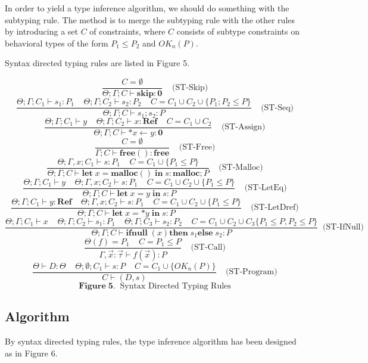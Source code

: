 \documentclass[english]{jssst_ppl} %
\newcommand\LET{\mathbf{let}\;}
\newcommand\IN{\mathbf{in}\;}
\newcommand\SKIP{\mathbf{skip}}
\newcommand\Rtab{\; \; \; \;}
\newcommand\IFNULL{\mathbf{ifnull}\;}
\newcommand\THEN{\mathbf{then}\;}
\newcommand\ELSE{\mathbf{else}\;}
\newcommand\Malloc{\mathbf{malloc}}
\newcommand\Free{\mathbf{free}}
\newcommand\Cirx{(x)}
\theoremstyle{definition}
\begin{document}
In order to yield a type inference algorithm, we should do something with the subtyping rule. The method is to merge the subtyping rule with the other rules by introducing a set $C$ of constraints, where $C$ consists of subtype constraints on behavioral types of the form $P_{1}\le P_{2}$ and $OK_{n}(P)$.

Syntax directed typing rules are listed in Figure 5.

$$
     \frac{ C = \emptyset}
           {\Theta; \Gamma; C \vdash \SKIP : \mathbf{0}}
      \Rtab \mbox{(ST-Skip)}
$$
$$
      \frac{\Theta;\Gamma ; C_{1} \vdash s_{1} : P_{1} \Rtab \Theta; \Gamma ; C_{2} \vdash s_{2} : P_{2} \Rtab C = C_{1}\cup C_{2} \cup \{ P_{1};P_{2} \le P\}}
      {\Theta;\Gamma; C \vdash s_{1};s_{2} : P}
      \Rtab \mbox{(ST-Seq)}
$$
$$
      \frac{\Theta;\Gamma;C_{1} \vdash y \Rtab \Theta;\Gamma; C_{2} \vdash x : \mathbf{Ref} \Rtab C = C_{1}\cup C_{2}}
      {\Theta;\Gamma; C \vdash *x \leftarrow y : \mathbf{0}}
      \Rtab \mbox{(ST-Assign)}
$$
$$
      \frac{C = \emptyset}
      {\Gamma ; C \vdash \Free() : \Free}
     \Rtab \mbox{(ST-Free)}
$$
$$
     \frac{\Theta;\Gamma, x ; C_{1} \vdash s : P_{1} \Rtab C = C_{1} \cup\{P_{1}\le P\}}
     {\Theta;\Gamma; C \vdash \LET x = \Malloc() \; \IN s : \Malloc ; P}
     \Rtab \mbox{(ST-Malloc)}
$$
$$
     \frac{\Theta;\Gamma; C_{1} \vdash y \Rtab \Theta;\Gamma, x ; C_{2} \vdash s : P_{1} \Rtab C = C_{1}\cup C_{2} \cup \{P_{1} \le P \}}
     {\Theta;\Gamma ; C \vdash \LET x = y \;  \IN s : P}
     \Rtab \mbox{(ST-LetEq)}
$$
$$
     \frac{\Theta;\Gamma ; C_{1} \vdash y: \mathbf{Ref} \Rtab \Theta;\Gamma, x ; C_{2} \vdash s : P_{1} \Rtab C = C_{1}\cup C_{2}\cup\{P_{1} \le P\}}
     {\Theta;\Gamma ; C \vdash \LET x = *y \; \IN s : P}
     \Rtab \mbox{(ST-LetDref)}
$$
$$
     \frac{\Theta;\Gamma; C_{1} \vdash x \Rtab \Theta;\Gamma; C_{2} \vdash s_{1} : P_{1} \Rtab \Theta;\Gamma; C_{3} \vdash s_{2} : P_{2}  \Rtab  C = C_{1} \cup C_{2} \cup C_{3} \{P_{1}\le P, P_{2}\le P \}}
     {\Theta;\Gamma; C \vdash \IFNULL\Cirx \THEN s_{1} \ELSE s_{2} : P }
    \; \;  \mbox{(ST-IfNull)}
$$
$$
     \frac{\Theta(f) = P_{1} \Rtab C = P_{1} \le P}
     {\Gamma,\vec{x}:\vec{\tau} \vdash f(\vec{x}) : P }
     \Rtab \mbox{(ST-Call)}
$$
$$
     \frac{\Theta \vdash D : \Theta \Rtab \Theta ; \emptyset ; C_{1} \vdash s : P \Rtab C = C_{1}\cup\{OK_{n}(P)\}}
     {C \vdash (D , s) }
     \Rtab \mbox{(ST-Program)}
$$
$$
    \mathbf{Figure \; 5.} \;\; \mbox{Syntax Directed Typing Rules}
$$
\subsection{Algorithm}
By syntax directed typing rules, the type inference algorithm has been designed as in Figure 6.
\end{document}
